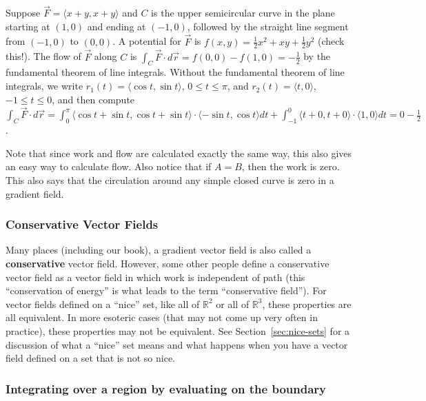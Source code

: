 \begin{example}
Suppose $\vec F = \langle x+y,x+y\rangle$ and $C$ is the upper
semicircular curve in the plane starting at $(1,0)$ and ending at
$(-1,0)$, followed by the straight line segment from $(-1,0)$ to
$(0,0)$. A potential for $\vec F$ is $f(x,y) =
\frac{1}{2}x^2+xy+\frac12 y^2$ (check this!).  The flow of $\vec F$
along $C$ is $\int_C \vec F \cdot d\vec r = f(0,0)-f(1,0) =-\frac{1}{2} $ by
the fundamental theorem of line integrals.  Without the fundamental
theorem of line integrals, we write $r_1(t) = \langle\cos t,\sin t\rangle$, $0\leq t\leq
\pi$, and $r_2(t) = \langle t,0\rangle$, $-1\leq t\leq 0$, and then compute $\int_C \vec F \cdot
d\vec r = \int_0^\pi \langle\cos t+\sin t,\cos t+\sin t\rangle\cdot\langle-\sin t, \cos t\rangle dt
+\int_{-1}^0\langle t+0,t+0\rangle\cdot\langle1,0\rangle dt = 0-\frac12$.
\end{example}


Note that since work and flow are calculated exactly the same way,
this also gives an easy way to calculate flow.  Also notice that if
$A=B$, then the work is zero.  This also says that the circulation
around any simple closed curve is zero in a gradient field.

\subsubsection{Conservative Vector Fields}

Many places (including our book), a gradient vector field is also
called a \textbf{conservative} vector field.  However, some other
people define a conservative vector field as a vector field in which
work is independent of path (this ``conservation of energy'' is what
leads to the term ``conservative field'').  For vector fields defined
on a ``nice'' set, like all of $\mathbb{R}^2$ or all of
$\mathbb{R}^3$, these properties are all equivalent.  In more esoteric
cases (that may not come up very often in practice), these properties
may not be equivalent.  See Section~\ref{sec:nice-sets} for a
discussion of what a ``nice'' set means and what happens when you have
a vector field defined on a set that is not so nice.


\subsubsection{Integrating over a region by evaluating on the
  boundary}

